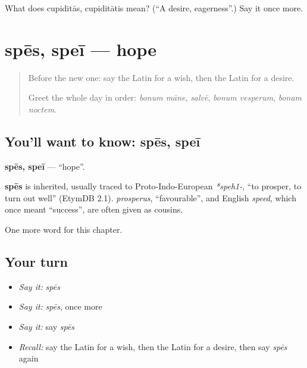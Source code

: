 \begin{tcolorbox}[breakable,colback=teal!4,colframe=teal!35!black,title={Before you move on}]
What does cupiditās, cupiditātis mean? (\textquotedblleft{}A desire, eagerness\textquotedblright{}.) Say it once more.
\end{tcolorbox}
\section[spēs, speī]{spēs, speī — hope}

\label{lesson:LA-C112-spes}



\begin{quote}
Before the new one: say the Latin for a wish, then the Latin for a desire.

Greet the whole day in order: \emph{bonum māne}, \emph{salvē}, \emph{bonum vesperum}, \emph{bonam noctem}.
\end{quote}

\subsection*{You'll want to know: spēs, speī}
\textbf{spēs, speī} — \textquotedblleft{}hope\textquotedblright{}.

\begin{cousinweb}
\textbf{spēs} is inherited, usually traced to Proto-Indo-European \emph{*speh1-}, \textquotedblleft{}to prosper, to turn out well\textquotedblright{} (EtymDB 2.1). \emph{prosperus}, \textquotedblleft{}favourable\textquotedblright{}, and English \emph{speed}, which once meant \textquotedblleft{}success\textquotedblright{}, are often given as cousins.
\end{cousinweb}

\begin{grammarlens}[title={What you've built}]
One more word for this chapter.
\end{grammarlens}

\subsection*{Your turn}
\begin{itemize}
\raggedright
  \item \emph{Say it:} \emph{spēs}
  \item \emph{Say it:} \emph{spēs}, once more
  \item \emph{Say it:} say \emph{spēs}
  \item \emph{Recall:} say the Latin for a wish, then the Latin for a desire, then say \emph{spēs} again
\end{itemize}

